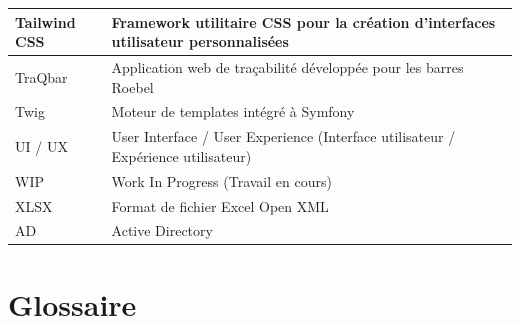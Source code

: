 \documentclass[11pt,a4paper]{article}
\begin{document}
\begin{tabular}{|p{4cm}|p{11cm}|}
\hline
Tailwind CSS & Framework utilitaire CSS pour la création d’interfaces utilisateur personnalisées \\
\hline
TraQbar & Application web de traçabilité développée pour les barres Roebel \\
\hline
Twig & Moteur de templates intégré à Symfony \\
\hline
UI / UX & User Interface / User Experience (Interface utilisateur / Expérience utilisateur) \\
\hline
WIP & Work In Progress (Travail en cours) \\
\hline
XLSX & Format de fichier Excel Open XML \\
\hline
AD & Active Directory \\
\hline
\end{tabular}


\newpage
\section*{Glossaire}

\end{document}
